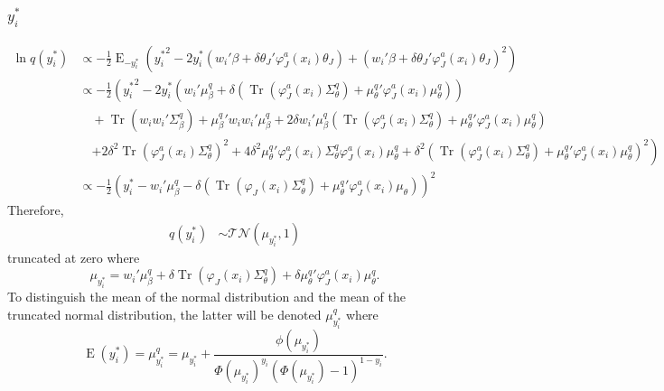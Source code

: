 \documentclass[11pt]{article}
\DeclareMathOperator{\Tr}{Tr}
\newcommand{\opn}{\operatorname}
\begin{document}
\subsubsection{$y_{i}^{*}$}
  \begin{align*}
    \ln q\left(y_{i}^{*}\right) &\propto -\frac{1}{2}\opn{E}_{-y_{i}^{*}}\left({y_{i}^{*}}^{2} -2y_{i}^{*}\left(w_{i}'\beta +\delta\theta_{J}'\varphi_{J}^{a}\left(x_{i}\right)\theta_{J}\right)+\left(w_{i}'\beta + \delta\theta_{J}'\varphi_{J}^{a}\left(x_{i}\right)\theta_{J}\right)^{2}\right)\\
    &\propto -\frac{1}{2}\left({y_{i}^{*}}^{2} -2y_{i}^{*}\left(w_{i}'\mu_{\beta}^{q} +\delta\left(\Tr\left(\varphi_{J}^{a}\left(x_{i}\right)\Sigma_{\theta}^{q}\right)+{\mu_{\theta}^{q}}'\varphi_{J}^{a}\left(x_{i}\right)\mu_{\theta}^{q}\right)\right)\right.\\
    &\quad  +\Tr\left(w_{i}w_{i}'\Sigma_{\beta}^{q}\right) + {\mu_{\beta}^{q}}'w_{i}w_{i}'\mu_{\beta}^{q} + 2\delta w_{i}'\mu_{\beta}^{q}\left(\Tr\left(\varphi_{J}^{a}\left(x_{i}\right)\Sigma_{\theta}^{q}\right)+ {\mu_{\theta}^{q}}'\varphi_{J}^{a}\left(x_{i}\right)\mu_{\theta}^{q}\right)\\
    &\quad \left. +2\delta^{2}\Tr\left(\varphi_{J}^{a}\left(x_{i}\right)\Sigma_{\theta}^{q}\right)^{2} + 4\delta^{2}{\mu_{\theta}^{q}}'\varphi_{J}^{a}\left(x_{i}\right)\Sigma_{\theta}^{q}\varphi_{J}^{a}\left(x_{i}\right)\mu_{\theta}^{q} + \delta^{2}\left(\Tr\left(\varphi_{J}^{a}\left(x_{i}\right)\Sigma_{\theta}^{q}\right)+ {\mu_{\theta}^{q}}'\varphi_{J}^{a}\left(x_{i}\right)\mu_{\theta}^{q}\right)^{2}\right)\\
    &\propto -\frac{1}{2}\left(y_{i}^{*} - w_{i}'\mu_{\beta}^{q} - \delta\left(\Tr\left(\varphi_{J}\left(x_{i}\right)\Sigma_{\theta}^{q}\right)+{\mu_{\theta}^{q}}'\varphi_{J}^{a}\left(x_{i}\right)\mu_{\theta}\right)\right)^{2}
  \end{align*}
Therefore,
  \begin{align*}
    q\left(y_{i}^{*}\right) &\sim \mathcal{TN}\left(\mu_{y_{i}^{*}}, 1\right)
  \end{align*}
truncated at zero where
  $$
    \mu_{y_{i}^{*}} = w_{i}'\mu_{\beta}^{q} + \delta\Tr\left(\varphi_{J}\left(x_{i}\right)\Sigma_{\theta}^{q}\right)+\delta{\mu_{\theta}^{q}}'\varphi_{J}^{a}\left(x_{i}\right)\mu_{\theta}^{q}.
  $$
To distinguish the mean of the normal distribution and the mean of the truncated normal distribution, the latter will be denoted $\mu_{y_{i}^{*}}^{q}$ where
  $$
    \opn{E}\left(y_{i}^{*}\right) = \mu_{y_{i}^{*}}^{q} = \mu_{y_{i}^{*}} + \frac{\phi\left(\mu_{y_{i}^{*}}\right)}{\Phi\left(\mu_{y_{i}^{*}}\right)^{y_{i}}\left(\Phi\left(\mu_{y_{i}^{*}}\right)-1\right)^{1-y_{i}}}.
  $$
\end{document}
